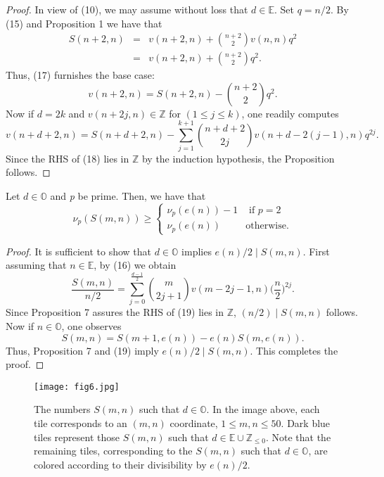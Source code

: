 \documentclass[]{amsart}
\begin{document}
\begin{proof}
In view of (10), we may assume without loss that $d \in \mathbb{E}$.  Set $q = n/2$.  By (15) and Proposition 1 we have that
\begin{eqnarray}
S(n+2,n) & = & v(n+2,n) + {n+2 \choose 2}v(n,n)q^{2} \nonumber \\
	     & = & v(n+2,n) + {n+2 \choose 2}q^{2}.
\end{eqnarray}
Thus, (17) furnishes the base case:
\[ v(n+2,n) = S(n+2,n) - {n+2 \choose 2}q^{2}. \]
Now if $d = 2k$ and $v(n+2j,n) \in \mathbb{Z}$ for $(1 \leq j \leq k)$, one readily computes
\begin{equation}
 v(n+d+2,n) = S(n+d+2,n) - \sum_{j=1}^{k+1}{n+d+2 \choose 2j}v(n+d-2(j-1),n)q^{2j}.
\end{equation}
Since the RHS of (18) lies in $\mathbb{Z}$ by the induction hypothesis, the Proposition follows.
\end{proof}
\begin{prop}
Let $d \in \mathbb{O}$ and \textit{p} be prime.  Then, we have that
$$
\nu_{p}(S(m,n)) \geq \left\{ \begin{array}{rl}
\nu_{p}(e(n))-1 &\mbox{ if $p=2$} \\
\nu_{p}(e(n)) &\mbox{otherwise.}
\end{array} \right.
$$
\end{prop}
\begin{proof}
It is sufficient to show that $d \in \mathbb{O}$ implies $e(n)/2 \mid S(m,n)$.  First assuming that $n \in \mathbb{E}$, by (16) we obtain
\begin{equation}
\frac{S(m,n)}{n/2} = \sum_{j=0}^{\frac{d-1}{2}}{m \choose 2j + 1}v(m-2j-1,n)\bigg(\frac{n}{2}\bigg)^{2j}.
\end{equation}
Since Proposition 7 assures the RHS of (19) lies in $\mathbb{Z}$,  $(n/2) \mid S(m,n)$ follows.  Now if $n \in \mathbb{O}$, one observes 
\[ S(m,n) = S(m+1,e(n)) - e(n)S(m,e(n)). \]
Thus, Proposition 7 and (19) imply $e(n)/2 \mid S(m,n)$. This completes the proof.
\end{proof}
\begin{figure}[h]
	\centering
	\texttt{[image: fig6.jpg]}
	\caption{The numbers $S(m,n)$ such that $d \in \mathbb{O}$.  In the image above, each tile corresponds to an $(m,n)$ coordinate, $1 \leq m,n \leq 50$.  Dark blue tiles represent those $S(m,n)$ such that $d \in \mathbb{E} \cup \mathbb{Z}_{\leq 0}$.  Note that the remaining tiles, corresponding to the $S(m,n)$ such that $d \in \mathbb{O}$, are colored according to their divisibility by $e(n)/2$.}
\end{figure}
\end{document}
